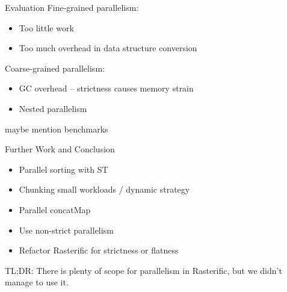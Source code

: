 \documentclass[slidestop,compress,mathserif, xcolor=table]{beamer}
\begin{document}
\begin{frame}[c]{Evaluation}
Fine-grained parallelism:
\begin{itemize}
\item Too little work
\item Too much overhead in data structure conversion
\end{itemize}
\bigskip

Coarse-grained parallelism:
\begin{itemize}
\item GC overhead -- strictness causes memory strain
\item Nested parallelism
\end{itemize}

maybe mention benchmarks
\end{frame}

\begin{frame}[c]{Further Work and Conclusion}

\begin{itemize}
\item Parallel sorting with ST
\item Chunking small workloads / dynamic strategy
\item Parallel concatMap
\item Use non-strict parallelism
\item Refactor Rasterific for strictness or flatness
\end{itemize}

\bigskip

TL;DR: There is plenty of scope for parallelism in Rasterific, but we didn't manage to use it.

\end{frame}
\end{document}
